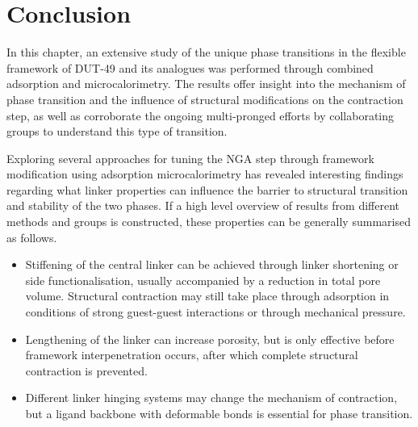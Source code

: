 
\section{Conclusion}

In this chapter, an extensive study of the unique phase transitions
in the flexible framework of DUT-49 and its analogues was performed
through combined adsorption and microcalorimetry.
The results offer insight into the mechanism of phase transition
and the influence of structural modifications on the contraction step,
as well as corroborate the ongoing multi-pronged efforts 
by collaborating groups to understand this type of transition.

Exploring several approaches for tuning the \gls{NGA} step through
framework modification using adsorption microcalorimetry has revealed
interesting findings regarding what linker properties can
influence the barrier to structural transition and stability of the
two phases. If a high level overview of results from different methods
and groups is constructed, these properties can be generally summarised
as follows.

\begin{itemize}
    \item Stiffening of the central linker can be achieved through 
    linker shortening or side functionalisation, usually accompanied 
    by a reduction in total pore volume. Structural contraction may 
    still take place through adsorption in conditions of strong 
    guest-guest interactions or through mechanical pressure.
    \item Lengthening of the linker can increase porosity,
    but is only effective before framework interpenetration 
    occurs, after which complete structural contraction is 
    prevented.
    \item Different linker hinging systems may change 
    the mechanism of contraction, but a ligand backbone with 
    deformable bonds is essential for phase transition.
\end{itemize}

